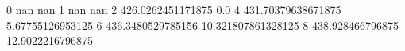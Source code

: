 0 nan nan
1 nan nan
2 426.0262451171875 0.0
4 431.70379638671875 5.67755126953125
6 436.3480529785156 10.321807861328125
8 438.928466796875 12.9022216796875
